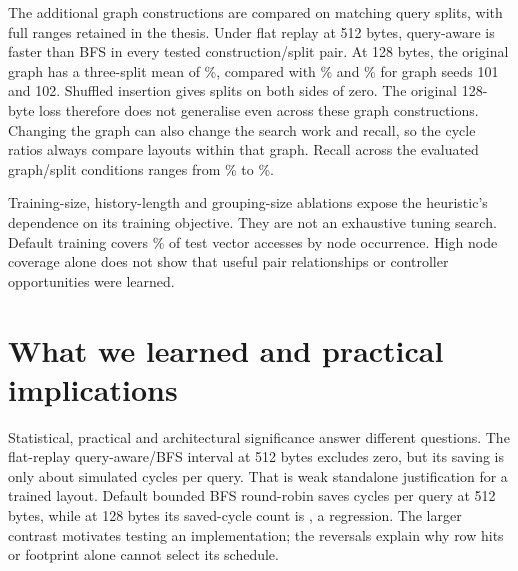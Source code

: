 \documentclass[conference]{IEEEtran}
\begin{document}
\begin{table}[htbp]\centering\small\setlength{\tabcolsep}{3.8pt}
\caption{Selected controller settings repeated across ten paired splits. Other controller and heuristic ablations remain single-split exploratory results.}\label{tab:controllers}

\end{table}

The additional graph constructions are compared on matching query splits, with full ranges retained in the thesis. Under flat replay at 512 bytes, query-aware is faster than BFS in every tested construction/split pair. At 128 bytes, the original graph has a three-split mean of \GraphRefCompact\%, compared with \GraphOneCompact\% and \GraphTwoCompact\% for graph seeds 101 and 102. Shuffled insertion gives splits on both sides of zero. The original 128-byte loss therefore does not generalise even across these graph constructions. Changing the graph can also change the search work and recall, so the cycle ratios always compare layouts within that graph. Recall across the evaluated graph/split conditions ranges from \GraphRecallMin\% to \GraphRecallMax\%.



Training-size, history-length and grouping-size ablations expose the heuristic's dependence on its training objective. They are not an exhaustive tuning search. Default training covers \MeanCoverage\% of test vector accesses by node occurrence. High node coverage alone does not show that useful pair relationships or controller opportunities were learned.




\section{What we learned and practical implications}
Statistical, practical and architectural significance answer different questions. The flat-replay query-aware/BFS interval at 512 bytes excludes zero, but its saving is only about \SavedCyclesPerQuery{} simulated cycles per query. That is weak standalone justification for a trained layout. Default bounded BFS round-robin saves \RoundRobinBFSSavedFloat{} cycles per query at 512 bytes, while at 128 bytes its saved-cycle count is \RoundRobinBFSSavedCompact{}, a regression. The larger contrast motivates testing an implementation; the reversals explain why row hits or footprint alone cannot select its schedule.
\end{document}
